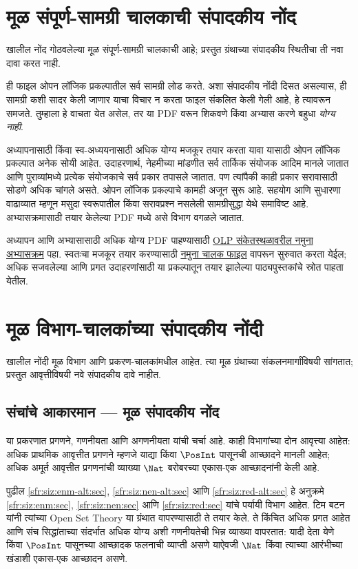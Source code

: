 \section{मूळ संपूर्ण-सामग्री चालकाची संपादकीय नोंद}
खालील नोंद गोठवलेल्या मूळ संपूर्ण-सामग्री चालकाची आहे; प्रस्तुत ग्रंथाच्या संपादकीय स्थितीचा ती नवा दावा करत नाही.
\begin{editorial}
ही फाइल ओपन लॉजिक प्रकल्पातील सर्व सामग्री लोड करते. अशा
संपादकीय नोंदी दिसत असल्यास, ही सामग्री कशी सादर केली जाणार
याचा विचार न करता फाइल संकलित केली गेली आहे, हे त्यावरून
समजते. तुम्हाला हे वाचता येत असेल, तर या PDF वरून शिकवणे
किंवा अभ्यास करणे बहुधा \emph{योग्य नाही}.

अध्यापनासाठी किंवा स्व-अध्ययनासाठी अधिक योग्य मजकूर तयार
करता यावा यासाठी ओपन लॉजिक प्रकल्पात अनेक सोयी आहेत.
उदाहरणार्थ, नेहमीच्या मांडणीत सर्व तार्किक संयोजक आदिम
मानले जातात आणि पुराव्यांमध्ये प्रत्येक संयोजकाचे सर्व प्रकार
तपासले जातात. पण त्यांपैकी काही प्रकार सरावासाठी सोडणे अधिक
चांगले असते. ओपन लॉजिक प्रकल्पाचे कामही अजून सुरू आहे.
सहयोग आणि सुधारणा वाढाव्यात म्हणून मसुदा स्वरूपातील किंवा
सरावप्रश्न नसलेली सामग्रीसुद्धा येथे समाविष्ट आहे. अभ्यासक्रमासाठी
तयार केलेल्या PDF मध्ये असे विभाग वगळले जातात.

अध्यापन आणि अभ्यासासाठी अधिक योग्य PDF पाहण्यासाठी
\href{http://builds.openlogicproject.org/}{OLP संकेतस्थळावरील नमुना अभ्यासक्रम}
पहा. स्वतःचा मजकूर तयार करण्यासाठी
\href{https://github.com/OpenLogicProject/OpenLogic/tree/master/courses/sample}{नमुना चालक फाइल}
वापरून सुरुवात करता येईल; अधिक सजवलेल्या आणि प्रगत उदाहरणांसाठी
या प्रकल्पातून तयार झालेल्या पाठ्यपुस्तकांचे स्रोत पाहता येतील.
\end{editorial}
\section{मूळ विभाग-चालकांच्या संपादकीय नोंदी}\label{source-driver:notes}
खालील नोंदी मूळ विभाग आणि प्रकरण-चालकांमधील आहेत. त्या मूळ ग्रंथाच्या संकलनमार्गांविषयी सांगतात; प्रस्तुत आवृत्तीविषयी नवे संपादकीय दावे नाहीत.
\subsection{संचांचे आकारमान — मूळ संपादकीय नोंद}\label{source-driver:OLP-0027}
\begin{editorial}
या प्रकरणात प्रगणने, गणनीयता आणि अगणनीयता यांची चर्चा आहे.
काही विभागांच्या दोन आवृत्त्या आहेत: अधिक प्राथमिक आवृत्तीत प्रगणने
म्हणजे याद्या किंवा $\PosInt$ पासूनची आच्छादने मानली आहेत;
अधिक अमूर्त आवृत्तीत प्रगणनांची व्याख्या $\Nat$ बरोबरच्या
एकास-एक आच्छादनांनी केली आहे.
\end{editorial}
\begin{editorial}
पुढील \ref{sfr:siz:enm-alt:sec},
\ref{sfr:siz:nen-alt:sec} आणि \ref{sfr:siz:red-alt:sec}
हे अनुक्रमे \ref{sfr:siz:enm:sec},
\ref{sfr:siz:nen:sec} आणि \ref{sfr:siz:red:sec}
यांचे पर्यायी विभाग आहेत. टिम बटन यांनी त्यांच्या Open Set Theory
या ग्रंथात वापरण्यासाठी ते तयार केले. ते किंचित अधिक प्रगत आहेत आणि
संच सिद्धांताच्या संदर्भात अधिक योग्य अशी गणनीयतेची भिन्न व्याख्या
वापरतात: यादी देता येणे किंवा $\PosInt$ पासूनच्या आच्छादक फलनाची
व्याप्ती असणे याऐवजी $\Nat$ किंवा त्याच्या आरंभीच्या खंडाशी एकास-एक
आच्छादन असणे.
\end{editorial}
